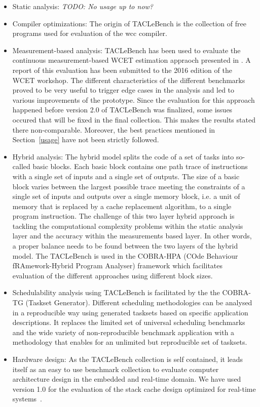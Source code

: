 \documentclass[a4paper,UKenglish]{oasics}
\newcommand{\todo}[1]{{\emph{TODO: #1}}}
\begin{document}
\begin{itemize}
\item Static analysis: \todo{No usage up to now?}
\item Compiler optimizations: The origin of TACLeBench is the collection of free
programs used for evaluation of the wcc compiler.
\item Measurement-based analysis: TACLeBench has been used to evaluate the continuous measurement-based WCET estimation appraoch presented in \cite{Dreyer2015}.
A report of this evaluation has been submitted to the 2016 edition of the WCET workshop.
The different characteristics of the different benchmarks proved to be very useful to trigger edge cases in the analysis and led to various improvements of the prototype.
Since the evaluation for this approach happened before version 2.0 of TACLeBench was finalized, some issues occured that will be fixed in the final collection.
This makes the results stated there non-comparable.
Moreover, the best practices mentioned in Section~\ref{usage} have not been strictly followed.
\item Hybrid analysis: The hybrid model splits the code of a set of tasks into so-
called basic blocks. Each basic block contains one path trace of instructions with a single set of inputs and a single set of outputs.  The  size  of  a  basic  block  varies  between  the  largest possible trace meeting the constraints of a single set of inputs and outputs over a single memory block, i.e. a unit of memory that is replaced by a cache replacement algorithm, to a single program instruction.
The  challenge  of  this  two  layer  hybrid  approach  is  tackling the computational complexity problems within the static analysis  layer  and  the  accuracy  within  the  measurements based  layer.  In  other  words,  a  proper  balance  needs  to  be found between the two layers of the hybrid model. The TACLeBench is used in the COBRA-HPA (COde Behaviour fRAmework-Hybrid Program Analyser) framework which facilitates evaluation of the different approaches using different block sizes.
\item Schedulability analysis using TACLeBench is facilitated by the the COBRA-TG (Taskset Generator). Different scheduling methodologies can be analysed in a reproducible way using generated tasksets based on specific application descriptions. It replaces the limited set of universal scheduling benchmarks and the wide variety of non-reproducible benchmark application with a methodology that enables for an unlimited but reproducible set of tasksets.
\item Hardware design: As the TACLeBench collection is self contained, it leads itself
as an easy to use benchmark collection to evaluate computer architecture design in the
embedded and real-time domain. We have used version 1.0 for the evaluation of the
stack cache design optimized for real-time systems~\cite{patmos:stackcache:rts}.


\end{itemize}
\end{document}
